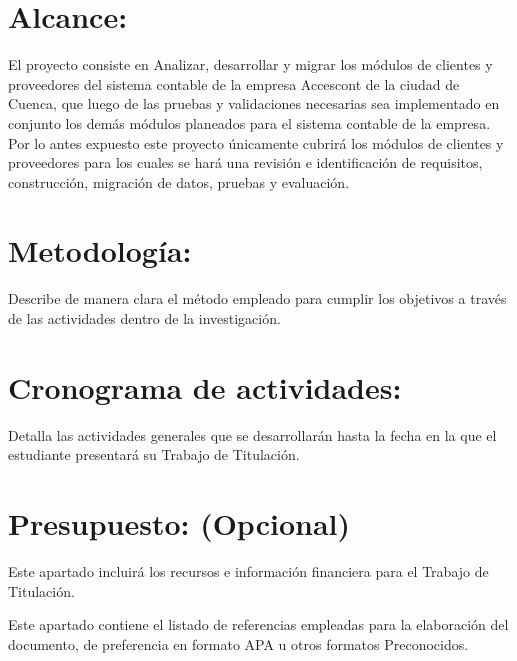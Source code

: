 \documentclass{article}
\begin{document}
\section{Alcance:}
El proyecto consiste en Analizar, desarrollar y migrar los módulos de clientes y proveedores del sistema contable de la empresa Accescont de la ciudad de Cuenca, que luego de las pruebas y validaciones necesarias sea implementado en conjunto los demás módulos planeados para el sistema contable de la empresa. Por lo antes expuesto este proyecto únicamente cubrirá los módulos de clientes y proveedores para los cuales se hará una revisión e identificación de requisitos, construcción, migración de datos, pruebas y evaluación.
\section{Metodología:}

Describe de manera clara el método empleado para cumplir los objetivos a través de las actividades dentro de la investigación. 
\section{Cronograma de actividades:}
Detalla las actividades generales que se desarrollarán hasta la fecha en la que el estudiante presentará su Trabajo de Titulación. 

\section{Presupuesto: (Opcional)}

Este apartado incluirá los recursos e información financiera para el Trabajo de Titulación. 
%





\vspace{1cm}
Este apartado contiene el listado de referencias empleadas para la elaboración del documento, de preferencia en formato APA u otros formatos Preconocidos.
\end{document}
